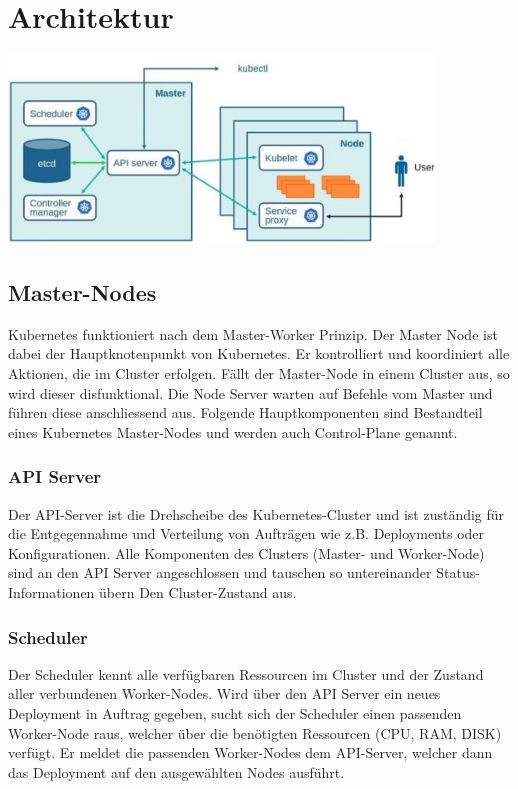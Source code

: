 \section{Architektur}
\begin{center}
	\includegraphics[height=50mm]{media/architektur.png}
\end{center}
\subsection{Master-Nodes}
Kubernetes funktioniert nach dem Master-Worker Prinzip.
Der Master Node ist dabei der Hauptknotenpunkt von Kubernetes. Er kontrolliert und koordiniert alle Aktionen, die im Cluster erfolgen. Fällt der Master-Node in einem Cluster aus, so wird dieser disfunktional. Die Node Server warten auf Befehle vom Master und führen diese anschliessend aus. Folgende Hauptkomponenten sind Bestandteil eines Kubernetes Master-Nodes und werden auch Control-Plane genannt.  \cite{kubernetes}
\subsubsection{API Server}
Der API-Server ist die Drehscheibe des Kubernetes-Cluster und ist zuständig für die Entgegennahme und Verteilung von Aufträgen wie z.B. Deployments oder Konfigurationen. Alle Komponenten des Clusters (Master- und Worker-Node) sind an den API Server angeschlossen und tauschen so untereinander Status-Informationen übern Den Cluster-Zustand aus. \cite{kubernetes}
\subsubsection{Scheduler}
Der Scheduler kennt alle verfügbaren Ressourcen im Cluster und der Zustand aller verbundenen Worker-Nodes. Wird über den API Server ein neues Deployment in Auftrag gegeben, sucht sich der Scheduler einen passenden Worker-Node raus, welcher über die benötigten Ressourcen (CPU, RAM, DISK) verfügt. Er meldet die passenden Worker-Nodes dem API-Server, welcher dann das Deployment auf den ausgewählten Nodes ausführt. \cite{kubernetes}
